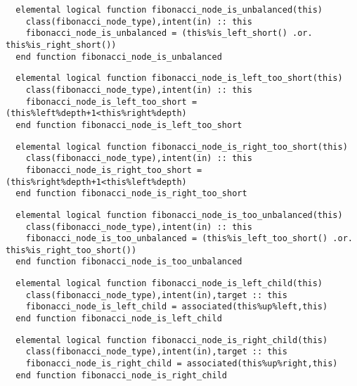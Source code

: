 \begin{Verbatim}
  elemental logical function fibonacci_node_is_unbalanced(this)
    class(fibonacci_node_type),intent(in) :: this
    fibonacci_node_is_unbalanced = (this%is_left_short() .or. this%is_right_short())
  end function fibonacci_node_is_unbalanced
\end{Verbatim}

\begin{Verbatim}
  elemental logical function fibonacci_node_is_left_too_short(this)
    class(fibonacci_node_type),intent(in) :: this
    fibonacci_node_is_left_too_short = (this%left%depth+1<this%right%depth)
  end function fibonacci_node_is_left_too_short
\end{Verbatim}

\begin{Verbatim}
  elemental logical function fibonacci_node_is_right_too_short(this)
    class(fibonacci_node_type),intent(in) :: this
    fibonacci_node_is_right_too_short = (this%right%depth+1<this%left%depth)
  end function fibonacci_node_is_right_too_short
\end{Verbatim}

\begin{Verbatim}
  elemental logical function fibonacci_node_is_too_unbalanced(this)
    class(fibonacci_node_type),intent(in) :: this
    fibonacci_node_is_too_unbalanced = (this%is_left_too_short() .or. this%is_right_too_short())
  end function fibonacci_node_is_too_unbalanced
\end{Verbatim}

\begin{Verbatim}
  elemental logical function fibonacci_node_is_left_child(this)
    class(fibonacci_node_type),intent(in),target :: this
    fibonacci_node_is_left_child = associated(this%up%left,this)
  end function fibonacci_node_is_left_child
\end{Verbatim}

\begin{Verbatim}
  elemental logical function fibonacci_node_is_right_child(this)
    class(fibonacci_node_type),intent(in),target :: this
    fibonacci_node_is_right_child = associated(this%up%right,this)
  end function fibonacci_node_is_right_child
\end{Verbatim}

